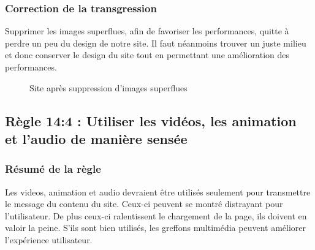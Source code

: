 \documentclass{article}[12pt]
\begin{document}
   \subsubsection*{Correction de la transgression}
   Supprimer les images superflues, afin de favoriser les performances, quitte à perdre un peu du design de notre site. Il faut néanmoins trouver un juste milieu et donc conserver le design du site tout en permettant une amélioration des performances.
   \begin{figure}[H]
   	\centering  {}
   	\caption{Site après suppression d'images superflues}
   \end{figure}
   
   \subsection{Règle 14:4 : Utiliser les vidéos, les animation et l'audio de manière sensée}
    	    \subsubsection*{Résumé de la règle}
	    	Les videos, animation et audio devraient être utilisés seulement pour transmettre le message du contenu du site. Ceux-ci peuvent se montré distrayant pour l'utilisateur. De plus ceux-ci ralentissent le chargement de la page, ils doivent en valoir la peine. S'ils sont bien  utilisés, les greffons multimédia peuvent améliorer l'expérience utilisateur.
    	    
\end{document}
